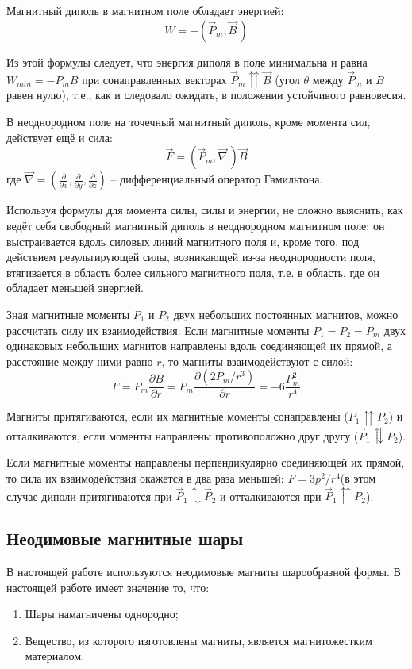 Магнитный диполь в магнитном поле обладает энергией:
\begin{equation}
    W = -(\vec P_m,\vec B \,)
\end{equation}

Из этой формулы следует, что энергия диполя в поле минимальна и равна $W_{min} = -P_m B$ при сонаправленных
векторах $\vec P_m \upuparrows \vec B$ (угол $\theta$ между $\vec P_m$ и $B$ равен нулю), т.е., как
и следовало ожидать, в положении устойчивого равновесия.

В неоднородном поле на точечный магнитный диполь, кроме момента сил, действует ещё и сила:
\begin{equation}
    \vec F = (\vec P_m, \vec \nabla \,)\vec B 
\end{equation}
где $\vec \nabla = \left(\frac{\partial}{\partial x}, \frac{\partial}{\partial y},
\frac{\partial}{\partial z}\right)$ -- дифференциальный оператор Гамильтона.

Используя формулы для момента силы, силы и энергии, не сложно выяснить, как ведёт себя свободный магнитный диполь в неоднородном магнитном поле: он выстраивается вдоль силовых линий магнитного поля и, кроме того, под действием результирующей силы, возникающей из-за неоднородности поля, втягивается в область более сильного магнитного поля, т.е. в область, где он обладает меньшей энергией.

Зная магнитные моменты $P_1$ и $P_2$ двух небольших постоянных магнитов, можно рассчитать силу их
взаимодействия. Если магнитные моменты $P_1=P_2=P_m$ двух одинаковых небольших магнитов
направлены вдоль соединяющей их прямой, а расстояние между ними равно $r$, то магниты взаимодействуют
с силой:
\begin{equation}
    F = P_m \frac{\partial B}{\partial r} = P_m \frac{\partial(2P_m/r^3)}{\partial r} =
    -6\frac{P_m^2}{r^4}
\end{equation}

Магниты притягиваются, если их магнитные моменты сонаправлены ($P_1 \upuparrows P_2$) и отталкиваются, если моменты
направлены противоположно друг другу ($\vec P_1 \updownarrows P_2$).

Если магнитные моменты направлены перпендикулярно соединяющей их прямой, то сила их взаимодействия
окажется в два раза меньшей: $F = 3p^2/r^4$(в этом случае диполи притягиваются при $\vec P_1
\updownarrows \vec P_2$ и
отталкиваются при $\vec P_1 \upuparrows P_2$).

\subsection*{Неодимовые магнитные шары}
В настоящей работе используются неодимовые магниты шарообразной формы.
В настоящей работе имеет значение то, что:
\begin{enumerate}
\item Шары намагничены однородно;
\item Вещество, из которого изготовлены магниты, является магнитожестким материалом.
\end{enumerate}

